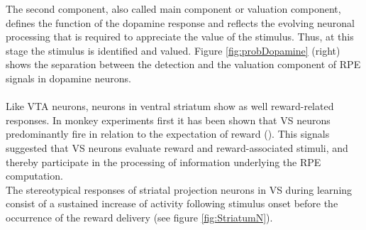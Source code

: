 The second component, also called main component or valuation component, defines the function of the dopamine response and reflects the evolving neuronal processing that is required to appreciate the value of the stimulus. Thus, at this stage the stimulus is identified and valued. Figure \ref{fig:probDopamine} (right) shows the separation between the detection and the valuation component of RPE signals in dopamine neurons.\\\\Like VTA neurons, neurons in ventral striatum show as well reward-related responses. In monkey experiments first it has been shown that VS neurons predominantly fire in relation to the expectation of reward (\cite{Schultz1992}). This signals suggested that VS neurons evaluate reward and reward-associated stimuli, and thereby participate in the processing of information underlying the RPE computation.\\The stereotypical responses of striatal projection neurons in VS during learning consist of a sustained increase of activity following stimulus onset before the occurrence of the reward delivery (see figure \ref{fig:StriatumN}).
